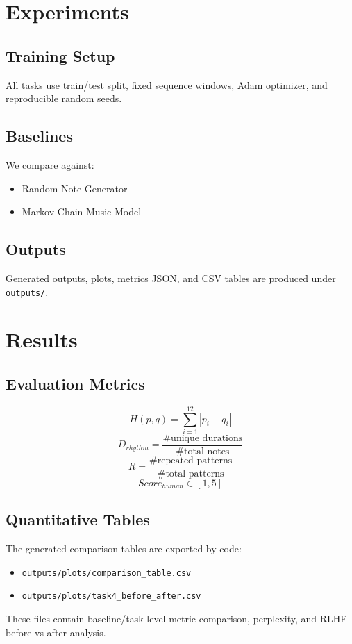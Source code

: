 \documentclass[conference]{IEEEtran}
\begin{document}
\section{Experiments}
\subsection{Training Setup}
All tasks use train/test split, fixed sequence windows, Adam optimizer, and reproducible random seeds.

\subsection{Baselines}
We compare against:
\begin{itemize}
    \item Random Note Generator
    \item Markov Chain Music Model
\end{itemize}

\subsection{Outputs}
Generated outputs, plots, metrics JSON, and CSV tables are produced under \texttt{outputs/}.

\section{Results}
\subsection{Evaluation Metrics}
\begin{equation}
H(p,q)=\sum_{i=1}^{12}|p_i-q_i|
\end{equation}
\begin{equation}
D_{rhythm}=\frac{\#\text{unique durations}}{\#\text{total notes}}
\end{equation}
\begin{equation}
R=\frac{\#\text{repeated patterns}}{\#\text{total patterns}}
\end{equation}
\begin{equation}
Score_{human}\in [1,5]
\end{equation}

\subsection{Quantitative Tables}
The generated comparison tables are exported by code:
\begin{itemize}
    \item \texttt{outputs/plots/comparison\_table.csv}
    \item \texttt{outputs/plots/task4\_before\_after.csv}
\end{itemize}
These files contain baseline/task-level metric comparison, perplexity, and RLHF before-vs-after analysis.
\end{document}
